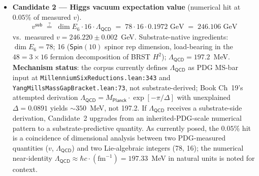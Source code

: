 \documentclass[11pt,a4paper]{amsart}
\theoremstyle{plain}
\theoremstyle{definition}
\begin{document}
\begin{itemize}[itemsep=2pt,leftmargin=2em]
\textbf{Mechanism status}: the single-operator eigenvalue-on-$E_6$ reading of $78 \cdot \varphi$ is mathematically closed off (Coxeter-element eigenvalues on the 78-adjoint lie in $\mathbb{Q}(\zeta_{12}) \cap \mathbb{R} = \mathbb{Q}(\sqrt{3})$, which strictly excludes $\varphi \in \mathbb{Q}(\sqrt{5})$; verified in this pass). The product $78 \cdot \varphi$ IS a rigorous algebraic identity: it equals the trace of $(\textsf{id}_{78} \otimes g_5)$ on the 234-dimensional tensor product of the $E_6$-adjoint with the icosahedral standard representation, i.e., $78 \cdot \chi_{\textsf{std}}(g_5) = 78 \cdot \varphi$. This is the substrate-shape-compatible three-substrate composition: 78 from the $E_6$ BRST substrate, $\varphi$ from the $H_3$ icosahedral / $\mathbb{Q}(\sqrt{5})$ substrate at the level of a well-defined rep-theoretic trace, and $\ln 3$ from the base-3 ternary substrate. The substrate mechanism identifying this rigorous trace-value with the raw Higgs mass eigenvalue --- and providing the physical mass-scale anchoring in GeV --- has not yet been constructed; the numerical hit is catalogued as pattern data awaiting mechanism.

\item \textbf{Candidate 2 --- Higgs vacuum expectation value} (numerical hit at $0.05\%$ of measured $v$).
\begin{equation*}
v^{\textsf{sub}} \;\stackrel{?}{=}\; \dim E_6 \cdot 16 \cdot \Lambda_{\textsf{QCD}} \;=\; 78 \cdot 16 \cdot 0.1972\text{ GeV} \;=\; 246.106\text{ GeV}
\end{equation*}
vs.\ measured $v = 246.220 \pm 0.002$~GeV. Substrate-native ingredients: $\dim E_6 = 78$; 16 ($\textsf{Spin}(10)$ spinor rep dimension, load-bearing in the $48 = 3 \times 16$ fermion decomposition of BRST $H^2$); $\Lambda_{\textsf{QCD}} = 197.2$~MeV. \textbf{Mechanism status}: the corpus currently defines $\Lambda_{\textsf{QCD}}$ as PDG MS-bar input at \texttt{MillenniumSixReductions.lean:343} and \texttt{YangMillsMassGapBracket.lean:73}, not substrate-derived; Book Ch~19's attempted derivation $\Lambda_{\textsf{QCD}} = M_{\textsf{Planck}} \cdot \exp[-\pi/\Delta]$ with unexplained $\Delta = 0.0891$ yields $\sim 350$~MeV, not 197.2. If $\Lambda_{\textsf{QCD}}$ receives a substrate-side derivation, Candidate~2 upgrades from an inherited-PDG-scale numerical pattern to a substrate-predictive quantity. As currently posed, the $0.05\%$ hit is a coincidence of dimensional analysis between two PDG-measured quantities ($v$, $\Lambda_{\textsf{QCD}}$) and two Lie-algebraic integers (78, 16); the numerical near-identity $\Lambda_{\textsf{QCD}} \approx \hbar c \cdot (\text{fm}^{-1}) = 197.33$~MeV in natural units is noted for context.


\end{itemize}
\end{document}
